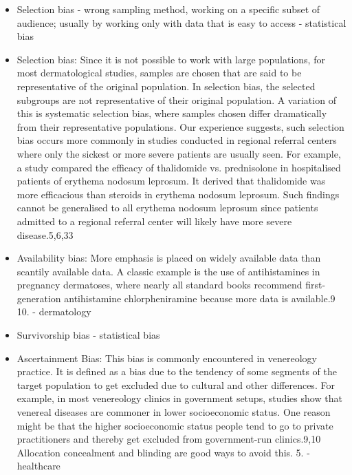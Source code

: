 \begin{refsection}
\begin{itemize}
			\item Selection bias - wrong sampling method, working on a specific subset of audience; usually by working only with data that is easy to access \autocites{Mester_2022}{Mester_2017} - statistical bias
			\item Selection bias: Since it is not possible to work with large populations, for most dermatological studies, samples are chosen that are said to be representative of the original population. 
			In selection bias, the selected subgroups are not representative of their original population.
			A variation of this is systematic selection bias, where samples chosen differ dramatically from their representative populations.
			Our experience suggests, such selection bias occurs more commonly in studies conducted in regional referral centers where only the sickest or more severe patients are usually seen.
			For example, a study compared the efficacy of thalidomide vs. prednisolone in hospitalised patients of erythema nodosum leprosum. It derived that thalidomide was more efficacious than steroids in erythema nodosum leprosum. Such findings cannot be generalised to all erythema nodosum leprosum since patients admitted to a regional referral center will likely have more severe disease.5,6,33 \autocite{Chakraborty_2024}
			\item  Availability bias: More emphasis is placed on widely available data than scantily available data. A classic example is the use of antihistamines in pregnancy dermatoses, where nearly all standard books recommend first-generation antihistamine chlorpheniramine because more data is available.9 10. \autocite{Chakraborty_2024} - dermatology
			
			\item Survivorship bias \autocites{Mester_2022}{Mester_2017} - statistical bias
			
			
			\item Ascertainment Bias: This bias is commonly encountered in venereology practice. It is defined as a bias due to the tendency of some segments of the target population to get excluded due to cultural and other differences. For example, in most venereology clinics in government setups, studies show that venereal diseases are commoner in lower socioeconomic status. One reason might be that the higher socioeconomic status people tend to go to private practitioners and thereby get excluded from government-run clinics.9,10 Allocation concealment and blinding are good ways to avoid this. 5. \autocite{Chakraborty_2024} - healthcare
			\rawcitationusedend
		\end{itemize}
		

\end{refsection}

